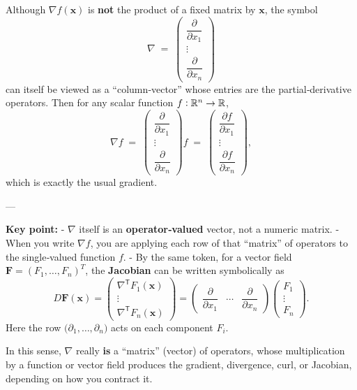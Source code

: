 \documentclass[11pt,openany]{article}
\renewcommand{\emph}[1]{\textbf{#1}}
\begin{document}
Although \(\nabla f(\mathbf x)\) is \emph{not} the product of a fixed matrix by \(\mathbf x\), the symbol
\[
\nabla
\;=\;
\begin{pmatrix}
	\dfrac{\partial}{\partial x_1}\\[6pt]
	\vdots\\[4pt]
	\dfrac{\partial}{\partial x_n}
\end{pmatrix}
\]
can itself be viewed as a “column‐vector” whose entries are the partial‐derivative operators.  Then for any scalar function \(f:\mathbb{R}^n\to\mathbb{R}\),
\[
\nabla f
\;=\;
\begin{pmatrix}
	\dfrac{\partial}{\partial x_1}\\[6pt]
	\vdots\\[4pt]
	\dfrac{\partial}{\partial x_n}
\end{pmatrix}
f
\;=\;
\begin{pmatrix}
	\dfrac{\partial f}{\partial x_1}\\[6pt]
	\vdots\\[4pt]
	\dfrac{\partial f}{\partial x_n}
\end{pmatrix},
\]
which is exactly the usual gradient.

---

\noindent\textbf{Key point:}  
- \(\nabla\) itself is an \emph{operator‐valued} vector, not a numeric matrix.  
- When you write \(\nabla f\), you are applying each row of that “matrix” of operators to the single‐valued function \(f\).  
- By the same token, for a vector field \(\mathbf F=(F_1,\dots,F_n)^T\), the \emph{Jacobian} can be written symbolically as
\[
D\mathbf F(\mathbf x)
=\begin{pmatrix}
	\nabla^{\mathsf T}F_1(\mathbf x)\\[4pt]
	\vdots\\[2pt]
	\nabla^{\mathsf T}F_n(\mathbf x)
\end{pmatrix}
=\begin{pmatrix}
	\dfrac{\partial}{\partial x_1}&\cdots&\dfrac{\partial}{\partial x_n}
\end{pmatrix}
\begin{pmatrix}
	F_1\\\vdots\\F_n
\end{pmatrix}.
\]
Here the row \(\bigl(\partial_{1},\dots,\partial_{n}\bigr)\) acts on each component \(F_i\).

In this sense, \(\nabla\) really \emph{is} a “matrix” (vector) of operators, whose multiplication by a function or vector field produces the gradient, divergence, curl, or Jacobian, depending on how you contract it.
\end{document}
